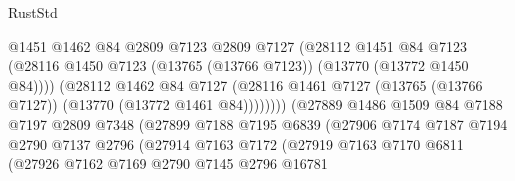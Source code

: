 \begin{lexlean}{RustStd}
\begin{coremodule}
                                      @1451
                                      @1462
                                      @84
                                      @2809
                                      @7123
                                      @2809
                                      @7127
                                      (@28112
                                        @1451
                                        @84
                                        @7123
                                        (@28116
                                          @1450
                                          @7123
                                          (@13765 (@13766 @7123))
                                          (@13770 (@13772 @1450 @84))))
                                      (@28112
                                        @1462
                                        @84
                                        @7127
                                        (@28116
                                          @1461
                                          @7127
                                          (@13765 (@13766 @7127))
                                          (@13770 (@13772 @1461 @84))))))))
                              (@27889
                                @1486
                                @1509
                                @84
                                @7188
                                @7197
                                @2809
                                @7348
                                (@27899
                                  @7188
                                  @7195
                                  @6839
                                  (@27906
                                    @7174
                                    @7187
                                    @7194
                                    @2790
                                    @7137
                                    @2796
                                    (@27914
                                      @7163
                                      @7172
                                      (@27919
                                        @7163
                                        @7170
                                        @6811
                                        (@27926
                                          @7162
                                          @7169
                                          @2790
                                          @7145
                                          @2796
                                          @16781

\end{coremodule}
\end{lexlean}
